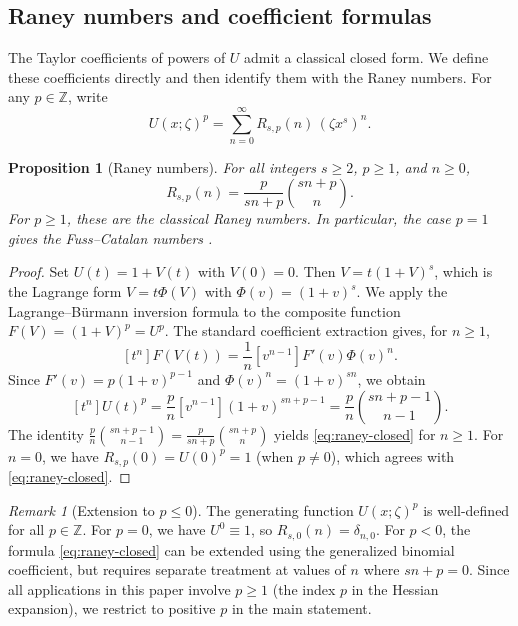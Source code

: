\documentclass[11pt]{amsart}
\numberwithin{equation}{section}
\theoremstyle{plain}
\newtheorem{proposition}[theorem]{Proposition}
\theoremstyle{definition}
\theoremstyle{remark}
\newtheorem{remark}[theorem]{Remark}
\begin{document}
\subsection{Raney numbers and coefficient formulas}
\label{subsec:raney}

The Taylor coefficients of powers of $U$ admit a classical closed form. We
define these coefficients directly and then identify them with the Raney numbers. For any $p \in \mathbb{Z}$, write
\begin{equation}\label{eq:raney-generating}
	U(x;\zeta)^{p} = \sum_{n=0}^{\infty} R_{s,p}(n) \, (\zeta x^s)^n.
\end{equation}


\begin{proposition}[Raney numbers]
	\label{prop:raney-lagrange}
	For all integers $s \ge 2$, $p \ge 1$, and $n \ge 0$,
	\begin{equation}\label{eq:raney-closed}
		R_{s,p}(n) = \frac{p}{sn + p} \binom{sn + p}{n}.
	\end{equation}
	For $p \ge 1$, these are the classical Raney numbers. In particular, the case $p = 1$
	gives the Fuss--Catalan numbers \cite{Raney1960,GrahamKnuthPatashnik1994}.
\end{proposition}

\begin{proof}
	Set $U (t) = 1 + V(t)$ with $V(0) = 0$. Then
	$V = t(1+V)^s$, which is the Lagrange form $V = t\Phi(V)$ with
	$\Phi(v) = (1+v)^s$. We apply the Lagrange--B\"urmann inversion formula to the
	composite function $F(V) = (1+V)^{p} = U^{p}$. The standard
	coefficient extraction \cite{Henrici1974,Comtet1974} gives, for $n \ge 1$,
	\[
		[t^n] F(V(t)) = \frac{1}{n} [v^{n-1}] F'(v) \Phi(v)^n.
	\]
	Since $F'(v) = p(1+v)^{p-1}$ and $\Phi(v)^n = (1+v)^{sn}$, we obtain
	\[
		[t^n] U(t)^{p}
		= \frac{p}{n} [v^{n-1}] (1+v)^{sn+p-1}
		= \frac{p}{n} \binom{sn+p-1}{n-1}.
	\]
	The identity
	$\frac{p}{n}\binom{sn+p-1}{n-1} = \frac{p}{sn+p}\binom{sn+p}{n}$
	yields \eqref{eq:raney-closed} for $n \ge 1$. For $n = 0$, we have
	$R_{s,p}(0) = U(0)^{p} = 1$ (when $p \neq 0$), which agrees
	with \eqref{eq:raney-closed}.
\end{proof}

\begin{remark}[Extension to $p \le 0$]
	\label{rem:raney-negative}
	The generating function $U(x;\zeta)^{p}$ is well-defined for all
	$p \in \mathbb{Z}$. For $p = 0$, we have $U^0 \equiv 1$,
	so $R_{s,0}(n) = \delta_{n,0}$. For $p < 0$, the formula
	\eqref{eq:raney-closed} can be extended using the generalized binomial
	coefficient, but requires separate treatment at values of $n$ where
	$sn + p = 0$. Since all applications in this paper involve $p \ge 1$
	(the index $p$ in the Hessian expansion), we restrict to positive $p$
	in the main statement.
\end{remark}
\end{document}
